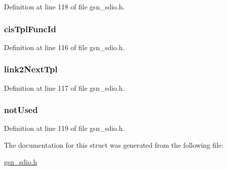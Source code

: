 Definition at line 118 of file gsn\_\-sdio.h.

\hypertarget{a00221_ae897ef59d4aba6192fbb03c505363471}{
\subsubsection[{cisTplFuncId}]{ {\bf cisTplFuncId}}}
\label{a00221_ae897ef59d4aba6192fbb03c505363471}


Definition at line 116 of file gsn\_\-sdio.h.

\hypertarget{a00221_adb5f177f5de86565991790a9c2c079b5}{
\subsubsection[{link2NextTpl}]{ {\bf link2NextTpl}}}
\label{a00221_adb5f177f5de86565991790a9c2c079b5}


Definition at line 117 of file gsn\_\-sdio.h.

\hypertarget{a00221_a0bbae02777b7e690c5c1e080c39a55df}{
\subsubsection[{notUsed}]{ {\bf notUsed}}}
\label{a00221_a0bbae02777b7e690c5c1e080c39a55df}


Definition at line 119 of file gsn\_\-sdio.h.



The documentation for this struct was generated from the following file:\begin{DoxyCompactItemize}
\item 
\hyperlink{a00584}{gsn\_\-sdio.h}\end{DoxyCompactItemize}
